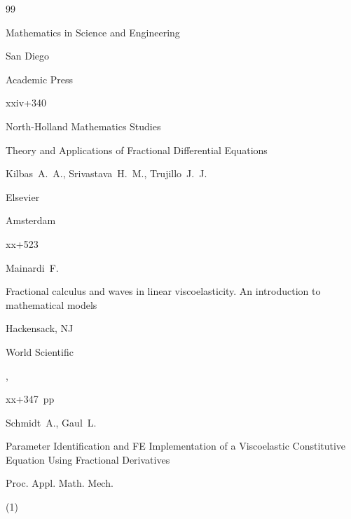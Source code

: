 \documentclass[11pt,a4paper,twoside]{article}
\begin{document}
\begin{thebibliography}{99}


\serial Mathematics in Science and Engineering




\publaddr San Diego


\publ Academic Press




\totalpages xxiv+340










\serial North-Holland Mathematics Studies






\book Theory and Applications of Fractional Differential Equations


\by Kilbas~A.~A., Srivastava~H.~M., Trujillo~J.~J.


\publ Elsevier


\publaddr Amsterdam


\totalpages xx+523












\by Mainardi~F.


\book Fractional calculus and waves in linear viscoelasticity. An introduction to mathematical models


\publaddr Hackensack, NJ


\publ World Scientific


,


\totalpages xx+347~pp











\by Schmidt~A., Gaul~L.


\paper Parameter Identification and FE Implementation of a Viscoelastic Constitutive Equation Using Fractional Derivatives


\jour Proc. Appl. Math. Mech.


(1)



\end{thebibliography}
\end{document}
